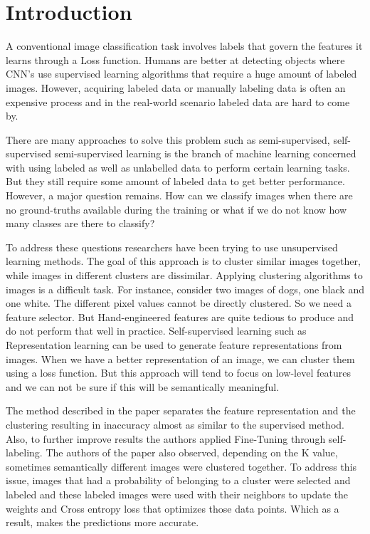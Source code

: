 \section{Introduction}
\label{sec:intro}
A conventional image classification task involves labels that govern the features it learns through a Loss function. Humans are better at detecting objects where CNN's use supervised learning algorithms that require a huge amount of labeled images. However, acquiring labeled data or manually labeling data is often an expensive process and in the real-world scenario labeled data are hard to come by.

\medskip
There are many approaches to solve this problem such as semi-supervised, self-supervised
\cite{DeepMetricLearning} 
semi-supervised learning is the branch of machine learning concerned with using labeled as well as unlabelled data to perform certain learning tasks. But they still require some amount of labeled data to get better performance. However, a major question remains. How can we classify images when there are no ground-truths available during the training or what if we do not know how many classes are there to classify?

\medskip

To address these questions researchers have been trying to use unsupervised learning methods.\cite{xie2016unsupervised} The goal of this approach is to cluster similar images together, while images in different clusters are dissimilar. Applying clustering algorithms to images is a difficult task. For instance, consider two images of dogs, one black and one white. The different pixel values cannot be directly clustered. So we need a feature selector. But Hand-engineered features are quite tedious to produce and do not perform that well in practice. 
Self-supervised learning such as Representation learning \cite{doersch2016unsupervised}\cite{gidaris2018unsupervised} can be used to generate feature representations from images. When we have a better representation of an image, we can cluster them using a loss function. But this approach will tend to focus on low-level features and we can not be sure if this will be semantically meaningful.  

\medskip
The method described in the paper separates the feature representation and the clustering resulting in inaccuracy almost as similar to the supervised method. Also, to further improve results the authors applied Fine-Tuning through self-labeling. The authors of the paper also observed, depending on the K value, sometimes semantically different images were clustered together. To address this issue, images that had a probability of belonging to a cluster were selected and labeled and these labeled images were used with their neighbors to update the weights and Cross entropy loss that optimizes those data points. Which as a result, makes the predictions more accurate. 

